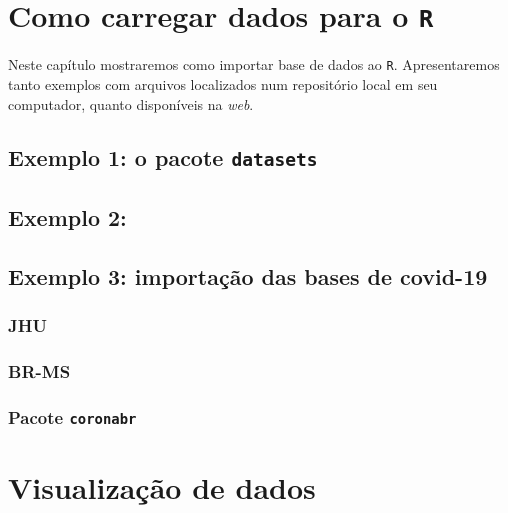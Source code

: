 \documentclass[
  12pt,
  brazilian,
]{book}
\begin{document}
\hypertarget{como-carregar-dados-para-o-r}{%
\chapter{\texorpdfstring{Como carregar dados para o \texttt{R}}{Como carregar dados para o R}}\label{como-carregar-dados-para-o-r}}

Neste capítulo mostraremos como importar base de dados ao \texttt{R}. Apresentaremos tanto exemplos com arquivos localizados num repositório local em seu computador, quanto disponíveis na \emph{web}.

\hypertarget{exemplo-1-o-pacote-datasets}{%
\section{\texorpdfstring{Exemplo 1: o pacote \texttt{datasets}}{Exemplo 1: o pacote datasets}}\label{exemplo-1-o-pacote-datasets}}

\hypertarget{exemplo-2}{%
\section{Exemplo 2:}\label{exemplo-2}}

\hypertarget{exemplo-3-importauxe7uxe3o-das-bases-de-covid-19}{%
\section{Exemplo 3: importação das bases de covid-19}\label{exemplo-3-importauxe7uxe3o-das-bases-de-covid-19}}

\hypertarget{jhu}{%
\subsection{JHU}\label{jhu}}

\hypertarget{br-ms}{%
\subsection{BR-MS}\label{br-ms}}

\hypertarget{pacote-coronabr}{%
\subsection{\texorpdfstring{Pacote \texttt{coronabr}}{Pacote coronabr}}\label{pacote-coronabr}}

\hypertarget{visualizauxe7uxe3o-de-dados}{%
\chapter{Visualização de dados}\label{visualizauxe7uxe3o-de-dados}}
\end{document}
